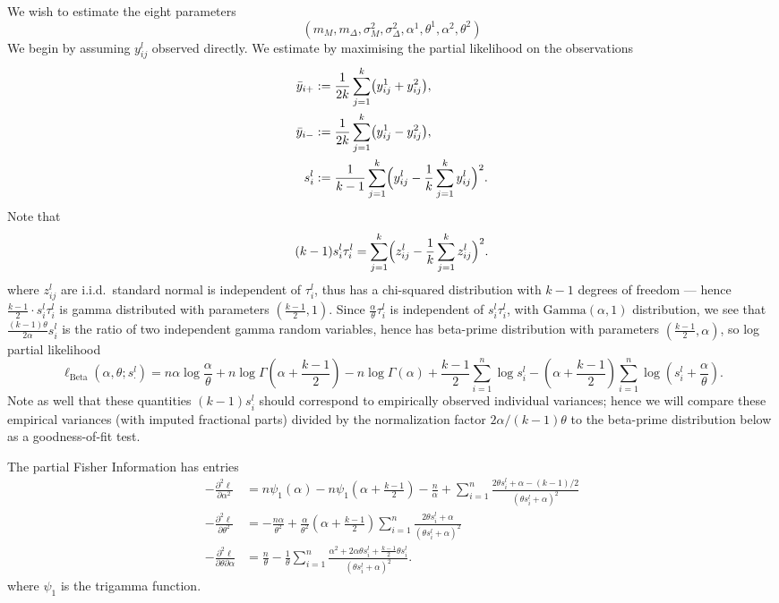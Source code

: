 \documentclass[
]{article}
\begin{document}
We wish to estimate the eight parameters
\[
(m_M,m_\Delta,\sigma^2_M,\sigma^2_\Delta,\alpha^1,\theta^1,\alpha^2,\theta^2)
\]
We begin by assuming \(y_{ij}^l\) observed directly. We estimate
by maximising the partial likelihood on the observations
\begin{align*}
  \bar{y}_{i+}&:= \frac{1}{2k} \sum_{j=1}^k \bigl( y_{ij}^1 + y_{ij}^2\bigr),\\
  \bar{y}_{i-}&:= \frac{1}{2k} \sum_{j=1}^k \bigl( y_{ij}^1 - y_{ij}^2 \bigr),\\
  s_i^l&:=  \frac{1}{k-1}\sum_{j=1}^k \Bigl( y_{ij}^l - \frac{1}{k} \sum_{j=1}^k y_{ij}^l \Bigr)^2.
\end{align*}
Note that
\[
(k-1)s_i^l \tau_i^l =\sum_{j=1}^k \Bigl( z_{ij}^l - \frac{1}{k} \sum_{j=1}^k z_{ij}^l \Bigr)^2.
\]
where \(z_{ij}^l\) are i.i.d.~standard normal
is independent of \(\tau_i^l\), thus has a chi-squared distribution
with \(k-1\) degrees of freedom --- hence \(\frac{k-1}{2}\cdot s_i^l\tau_i^l\) is
gamma distributed with parameters \((\frac{k-1}{2},1)\). Since \(\frac{\alpha}{\theta}\tau_i^l\) is independent of \(s_i^l\tau_i^l\), with \(\mathrm{Gamma}(\alpha,1)\) distribution, we see that \(\frac{(k-1)\theta}{2\alpha}s_i^l\) is the ratio of two independent gamma random variables, hence has beta-prime distribution with parameters \(\left(\frac{k-1}{2}, \alpha \right)\), so log partial likelihood
\[
  \ell_{\operatorname{Beta}}(\alpha,\theta;s^l_\cdot)=n\alpha \log\frac{\alpha}{\theta}+n\log\Gamma\left(\alpha+\frac{k-1}{2}\right)-n\log\Gamma(\alpha)
  + \frac{k-1}{2} \sum_{i=1}^n \log s_i^l -\left(\alpha+\frac{k-1}{2}\right) \sum_{i=1}^n \log \left(s_i^l+\frac\alpha\theta\right).
\]
Note as well that these quantities \((k-1)s_i^l\) should correspond to empirically observed individual variances; hence we will compare these empirical variances (with imputed fractional parts) divided by the normalization factor \(2\alpha/(k-1)\theta\) to the beta-prime distribution below as a goodness-of-fit test.

The partial Fisher Information has entries
\begin{align*}
 -\frac{\partial^2 \ell}{\partial \alpha^2} &=
   n\psi_1\left(\alpha\right) - n\psi_1\left(\alpha+\frac{k-1}{2}\right)
  - \frac{n}{\alpha} +\sum_{i=1}^n \frac{2\theta s_i^l + \alpha-(k-1)/2}{(\theta s_i^l + \alpha)^2}\\
-\frac{\partial^2 \ell}{\partial \theta^2} &=
   -\frac{n \alpha}{\theta^2} +\frac{\alpha}{\theta^2}\left(\alpha+\frac{k-1}{2}\right)\sum_{i=1}^n \frac{2\theta s_i^l + \alpha}{(\theta s_i^l + \alpha)^2}\\
-\frac{\partial^2 \ell}{\partial \theta\partial\alpha} &= \frac{n}{\theta}-
   \frac1\theta \sum_{i=1}^n \frac{\alpha^2+2\alpha\theta s_i^l+\frac{k-1}{2}\theta s_i^l}{(\theta s_i^l + \alpha)^2}.
\end{align*}
where \(\psi_1\) is the trigamma function.
\end{document}
